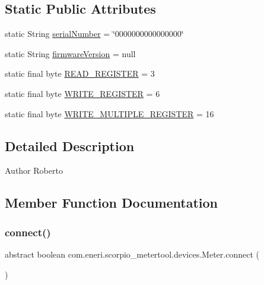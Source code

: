 \subsection*{Static Public Attributes}
\begin{DoxyCompactItemize}
\item 
static String \hyperlink{classcom_1_1eneri_1_1scorpio__metertool_1_1devices_1_1_meter_aa483bb8cde768ca0dbf9182287359678}{serial\+Number} = \char`\"{}0000000000000000\char`\"{}
\item 
static String \hyperlink{classcom_1_1eneri_1_1scorpio__metertool_1_1devices_1_1_meter_a5f4d3074f5f28dd89655af09cc9b33e7}{firmware\+Version} = null
\item 
static final byte \hyperlink{classcom_1_1eneri_1_1scorpio__metertool_1_1devices_1_1_meter_abe92b599eaf200e1e06c812009fa3fa1}{R\+E\+A\+D\+\_\+\+R\+E\+G\+I\+S\+T\+ER} = 3
\item 
static final byte \hyperlink{classcom_1_1eneri_1_1scorpio__metertool_1_1devices_1_1_meter_a1d31c881fda82b2252cdde18f3bc644e}{W\+R\+I\+T\+E\+\_\+\+R\+E\+G\+I\+S\+T\+ER} = 6
\item 
static final byte \hyperlink{classcom_1_1eneri_1_1scorpio__metertool_1_1devices_1_1_meter_aad22897c98f7355d3c7e62ea15b98e1b}{W\+R\+I\+T\+E\+\_\+\+M\+U\+L\+T\+I\+P\+L\+E\+\_\+\+R\+E\+G\+I\+S\+T\+ER} = 16
\end{DoxyCompactItemize}


\subsection{Detailed Description}
\begin{DoxyAuthor}{Author}
Roberto 
\end{DoxyAuthor}


\subsection{Member Function Documentation}
\mbox{\label{classcom_1_1eneri_1_1scorpio__metertool_1_1devices_1_1_meter_af24519e235b9d1fc9e9a4c5c9a086913}} 
\subsubsection{\texorpdfstring{connect()}{connect()}}
{\footnotesize\ttfamily abstract boolean com.\+eneri.\+scorpio\+\_\+metertool.\+devices.\+Meter.\+connect (\begin{DoxyParamCaption}{ }\end{DoxyParamCaption})\hspace{0.3cm}{\ttfamily [abstract]}}

